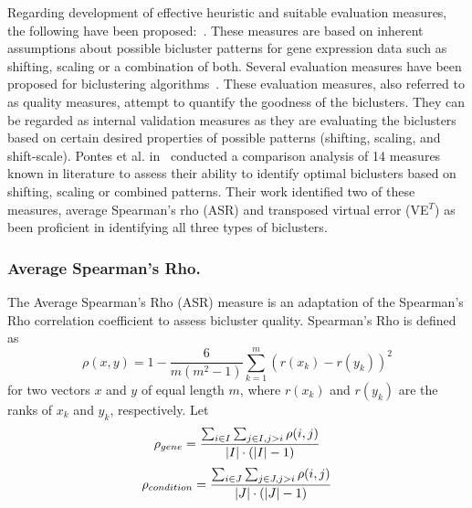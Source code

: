 Regarding development of effective heuristic and suitable evaluation measures, the following have been proposed:~\cite{cheng2000biclustering,pontes2007virtual,mukhopadhyay2009novel,ayadi2009biclustering,pontes2010measuring}.
These measures are based on inherent assumptions about possible bicluster patterns for gene expression data such as shifting, scaling or a combination of both.
Several evaluation measures have been proposed for biclustering algorithms~\cite{pontes2015quality}.
These evaluation measures, also referred to as quality measures, attempt to quantify the goodness of the biclusters.
They can be regarded as internal validation measures as they are evaluating the biclusters based on certain desired properties of possible patterns (shifting, scaling, and shift-scale).
Pontes et al. in~\cite{pontes2015quality} conducted a comparison analysis of 14 measures known in literature to assess their ability to identify optimal biclusters based on shifting, scaling or combined patterns.
Their work identified two of these measures, average Spearman's rho (ASR) and transposed virtual error (VE$^T$) as been proficient in identifying all three types of biclusters.

\subsubsection{Average Spearman's Rho.}
\label{sec:asr}

The Average Spearman's Rho (ASR) \cite{ayadi2009biclustering} measure is an adaptation of the Spearman's Rho \cite{lehmann1975nonparametrics} correlation coefficient to assess bicluster quality. Spearman's Rho is defined as
\begin{equation}\label{spearman_rho}
	\rho(x, y) = 1 - \frac{6}{m(m^2-1)} \sum_{k=1}^{m} \left(r\left(x_k\right) - r\left(y_k\right)\right)^2
\end{equation}
for two vectors $x$ and $y$ of equal length $m$, where $r(x_k)$ and $r(y_k)$ are the ranks of $x_k$ and $y_k$, respectively. Let
\begin{equation}
	\rho_{\normalfont{gene}} = \frac{\sum_{i \in I} \sum_{j \in I, j > i} \rho(i, j)}{\lvert I \rvert \cdot \left(\lvert I \rvert - 1\right)}
\end{equation}
\begin{equation}
	\rho_{\normalfont{condition}} = \frac{\sum_{i \in J} \sum_{j \in J, j > i} \rho(i, j)}{\lvert J \rvert \cdot \left(\lvert J \rvert - 1\right)}
\end{equation}

